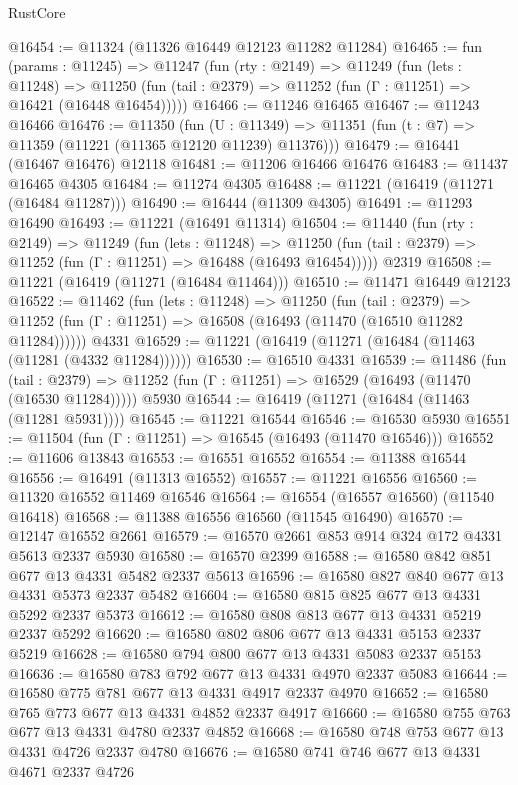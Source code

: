 \begin{lexlean}{RustCore}
\begin{coremodule}
@16454 := @11324 (@11326 @16449 @12123 @11282 @11284)
@16465 := fun (params : @11245) =>
  @11247
    (fun (rty : @2149) =>
    @11249
      (fun (lets : @11248) =>
      @11250 (fun (tail : @2379) => @11252 (fun (Γ : @11251) => @16421 (@16448 @16454)))))
@16466 := @11246 @16465
@16467 := @11243 @16466
@16476 := @11350
    (fun (U : @11349) => @11351 (fun (t : @7) => @11359 (@11221 (@11365 @12120 @11239) @11376)))
@16479 := @16441 (@16467 @16476) @12118
@16481 := @11206 @16466 @16476
@16483 := @11437 @16465 @4305
@16484 := @11274 @4305
@16488 := @11221 (@16419 (@11271 (@16484 @11287)))
@16490 := @16444 (@11309 @4305)
@16491 := @11293 @16490
@16493 := @11221 (@16491 @11314)
@16504 := @11440
    (fun (rty : @2149) =>
    @11249
      (fun (lets : @11248) =>
      @11250 (fun (tail : @2379) => @11252 (fun (Γ : @11251) => @16488 (@16493 @16454)))))
    @2319
@16508 := @11221 (@16419 (@11271 (@16484 @11464)))
@16510 := @11471 @16449 @12123
@16522 := @11462
    (fun (lets : @11248) =>
    @11250
      (fun (tail : @2379) =>
      @11252 (fun (Γ : @11251) => @16508 (@16493 (@11470 (@16510 @11282 @11284))))))
    @4331
@16529 := @11221 (@16419 (@11271 (@16484 (@11463 (@11281 (@4332 @11284))))))
@16530 := @16510 @4331
@16539 := @11486
    (fun (tail : @2379) => @11252 (fun (Γ : @11251) => @16529 (@16493 (@11470 (@16530 @11284)))))
    @5930
@16544 := @16419 (@11271 (@16484 (@11463 (@11281 @5931))))
@16545 := @11221 @16544
@16546 := @16530 @5930
@16551 := @11504 (fun (Γ : @11251) => @16545 (@16493 (@11470 @16546)))
@16552 := @11606 @13843
@16553 := @16551 @16552
@16554 := @11388 @16544
@16556 := @16491 (@11313 @16552)
@16557 := @11221 @16556
@16560 := @11320 @16552 @11469 @16546
@16564 := @16554 (@16557 @16560) (@11540 @16418)
@16568 := @11388 @16556 @16560 (@11545 @16490)
@16570 := @12147 @16552 @2661
@16579 := @16570 @2661 @853 @914 @324 @172 @4331 @5613 @2337 @5930
@16580 := @16570 @2399
@16588 := @16580 @842 @851 @677 @13 @4331 @5482 @2337 @5613
@16596 := @16580 @827 @840 @677 @13 @4331 @5373 @2337 @5482
@16604 := @16580 @815 @825 @677 @13 @4331 @5292 @2337 @5373
@16612 := @16580 @808 @813 @677 @13 @4331 @5219 @2337 @5292
@16620 := @16580 @802 @806 @677 @13 @4331 @5153 @2337 @5219
@16628 := @16580 @794 @800 @677 @13 @4331 @5083 @2337 @5153
@16636 := @16580 @783 @792 @677 @13 @4331 @4970 @2337 @5083
@16644 := @16580 @775 @781 @677 @13 @4331 @4917 @2337 @4970
@16652 := @16580 @765 @773 @677 @13 @4331 @4852 @2337 @4917
@16660 := @16580 @755 @763 @677 @13 @4331 @4780 @2337 @4852
@16668 := @16580 @748 @753 @677 @13 @4331 @4726 @2337 @4780
@16676 := @16580 @741 @746 @677 @13 @4331 @4671 @2337 @4726

\end{coremodule}
\end{lexlean}
